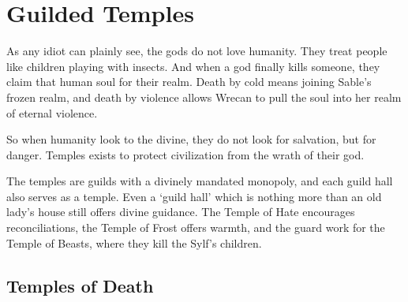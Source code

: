 \chapter{Guilded Temples}

As any idiot can plainly see, the gods do not love humanity.
They treat people like children playing with insects.
And when a god finally kills someone, they claim that human soul for their realm.
Death by cold means joining Sable's frozen realm, and death by violence allows Wrecan to pull the soul into her realm of eternal violence.

So when humanity look to the divine, they do not look for salvation, but for danger.
Temples exists to protect civilization from the wrath of their god.

The temples are guilds with a divinely mandated monopoly, and each guild hall also serves as a temple.
Even a `guild hall' which is nothing more than an old lady's house still offers divine guidance.
The Temple of Hate encourages reconciliations, the Temple of Frost offers warmth, and the \gls{guard} work for the Temple of Beasts, where they kill the Sylf's children.

\section{Temples of Death}

